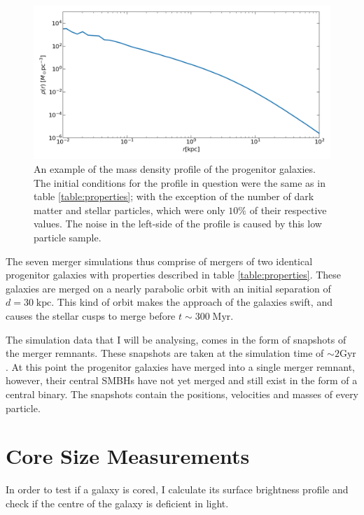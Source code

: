 \documentclass[english, twoside]{HYgradu}
\begin{document}
\begin{figure}
	\centering
	\includegraphics[width=\textwidth]{IC.png}
	\caption{An example of the mass density profile of the progenitor galaxies. The initial conditions for the profile in question were the same as in table \ref{table:properties}; with the exception of the number of dark matter and stellar particles, which were only $10\%$ of their respective values. The noise in the left-side of the profile is caused by this low particle sample.}
	\label{figure:IC_density_profile}
\end{figure}

The seven merger simulations thus comprise of mergers of two identical progenitor galaxies with properties described in table \ref{table:properties}. These galaxies are merged on a nearly parabolic orbit with an initial separation of $d = 30 \; \mathrm{kpc}$. This kind of orbit makes the approach of the galaxies swift, and causes the stellar cusps to merge before $t \sim 300 \; \mathrm{Myr}$.

The simulation data that I will be analysing, comes in the form of snapshots of the merger remnants. These snapshots are taken at the simulation time of $\sim 2 \mathrm{Gyr}$. At this point the progenitor galaxies have merged into a single merger remnant, however, their central SMBHs have not yet merged and still exist in the form of a central binary. The snapshots contain the positions, velocities and masses of every particle.

\section{Core Size Measurements}

In order to test if a galaxy is cored, I calculate its surface brightness profile and check if the centre of the galaxy is deficient in light.
\end{document}
